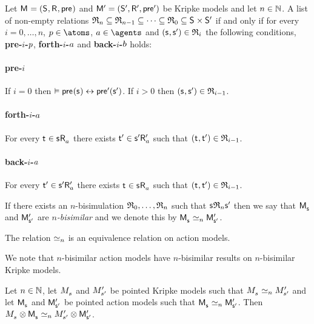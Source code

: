 \begin{definition}[$n$-bisimulation]
Let $\aModelAndTuple$ and $\aModelAndTupleP$ be Kripke models and let $n \in \naturals$.
A list of non-empty relations $\bisimulation_n \subseteq \bisimulation_{n - 1} \subseteq \cdots \subseteq \bisimulation_0 \subseteq \aStates \times \aStatesP$ if and only if for every $i = 0, \dots, n$, $\atomP \in \atoms$, $\agentA \in \agents$ and $(\aStateS, \aStateSP) \in \bisimulation_i$ the following conditions, {\bf pre-$i$-$\atomP$}, {\bf forth-$i$-$\agentA$} and {\bf back-$i$-$\agentB$} holds:

\paragraph{pre-$i$}
If $i = 0$ then $\entails \aPrecondition(\aStateS) \iff \aPreconditionP(\aStateSP)$.
If $i > 0$ then $(\aStateS, \aStateSP) \in \bisimulation_{i - 1}$.

\paragraph{forth-$i$-$\agentA$}
For every $\aStateT \in \aSuccessorsA{\aStateS}$ there exists $\aStateTP \in \aSuccessorsPA{\aStateSP}$ such that $(\aStateT, \aStateTP) \in \bisimulation_{i - 1}$.

\paragraph{back-$i$-$\agentA$}
For every $\aStateTP \in \aSuccessorsPA{\aStateSP}$ there exists $\aStateT \in \aSuccessorsA{\aStateS}$ such that $(\aStateT, \aStateTP) \in \bisimulation_{i - 1}$.

If there exists an $n$-bisimulation $\bisimulation_0, \dots, \bisimulation_n$ such that $\aStateS \bisimulation_n \aStateSP$ then we say that $\aPModel{\aStateS}$ and $\aPModelP{\aStateSP}$ are {\em $n$-bisimilar} and we denote this by $\aPModel{\aStateS} \bisimilar[n] \aPModelP{\aStateSP}$.
\end{definition}

\begin{proposition}
The relation $\bisimilar[n]$ is an equivalence relation on action models.
\end{proposition}

We note that $n$-bisimilar action models have $n$-bisimilar results on $n$-bisimilar Kripke models.

\begin{proposition}
Let $n \in \naturals$,
let $\kPModel{\kStateS}$ and $\kPModelP{\kStateSP}$ be pointed Kripke models such that $\kPModel{\kStateS} \bisimilar[n] \kPModelP{\kStateSP}$ and
let $\aPModel{\aStateS}$ and $\aPModelP{\aStateSP}$ be pointed action models such that $\aPModel{\aStateS} \bisimilar[n] \aPModelP{\aStateSP}$.
Then $\kPModel{\kStateS} \exec \aPModel{\aStateS} \bisimilar[n] \kPModelP{\kStateSP} \exec \aPModelP{\aStateSP}$.
\end{proposition}

